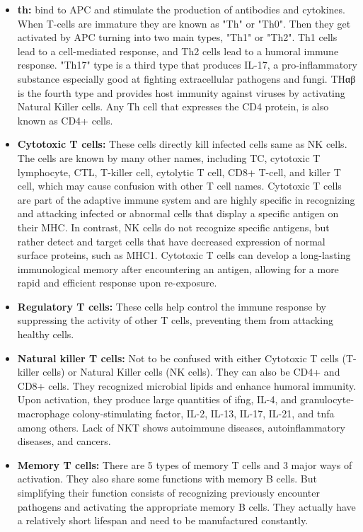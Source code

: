 \begin{itemize}
            \begin{itemize}
    
                \item{\textbf{\gls{th}:}} bind to APC and stimulate the production of antibodies and cytokines. When T-cells are immature they are known as "Th" or "Th0". Then they get activated by APC turning into two main types, "Th1" or "Th2". Th1 cells lead to a cell-mediated response, and Th2 cells lead to a humoral immune response. "Th17" type is a third type that produces IL-17, a pro-inflammatory substance especially good at fighting extracellular pathogens and fungi. THαβ is the fourth type and  provides host immunity against viruses by activating Natural Killer cells. Any Th cell that expresses the CD4 protein, is also known as CD4+ cells.
        
                \item{\textbf{Cytotoxic T cells:}} These cells directly kill infected cells same as NK cells. The cells are known by many other names, including TC, cytotoxic T lymphocyte, CTL, T-killer cell, cytolytic T cell, CD8+ T-cell, and killer T cell, which may cause confusion with other T cell names. Cytotoxic T cells are part of the adaptive immune system and are highly specific in recognizing and attacking infected or abnormal cells that display a specific antigen on their MHC. In contrast, NK cells do not recognize specific antigens, but rather detect and target cells that have decreased expression of normal surface proteins, such as MHC1. Cytotoxic T cells can develop a long-lasting immunological memory after encountering an antigen, allowing for a more rapid and efficient response upon re-exposure.
        
                \item{\textbf{Regulatory T cells:}} These cells help control the immune response by suppressing the activity of other T cells, preventing them from attacking healthy cells.
        
                \item{\textbf{Natural killer T cells:}} Not to be confused with either Cytotoxic T cells (T-killer cells) or Natural Killer cells (NK cells). They can also be CD4+ and CD8+ cells. They recognized microbial lipids and enhance humoral immunity. Upon activation, they produce large quantities of \gls{ifng}, IL-4, and granulocyte-macrophage colony-stimulating factor, IL-2, IL-13, IL-17, IL-21, and \gls{tnfa} among others. Lack of NKT shows autoimmune diseases, autoinflammatory diseases, and cancers.
        
                \item{\textbf{Memory T cells:}} There are 5 types of memory T cells and 3 major ways of activation. They also share some functions with memory B cells. But simplifying their function consists of recognizing previously encounter pathogens and activating the appropriate memory B cells. They actually have a relatively short lifespan and need to be manufactured constantly.
    
            \end{itemize}
        
    \end{itemize}


